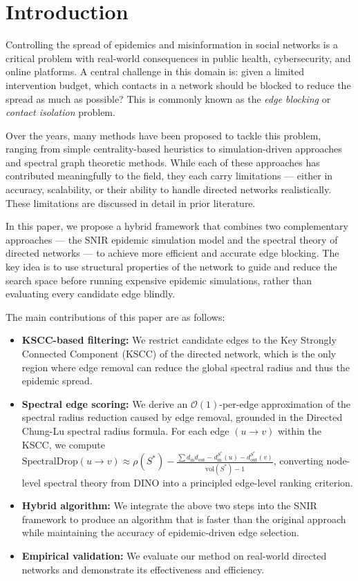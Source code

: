 \documentclass[conference]{IEEEtran}
\begin{document}
\section{Introduction}
Controlling the spread of epidemics and misinformation in social networks is a critical problem with real-world consequences in public health, cybersecurity, and online platforms. A central challenge in this domain is: given a limited intervention budget, which contacts in a network should be blocked to reduce the spread as much as possible? This is commonly known as the \textit{edge blocking} or \textit{contact isolation} problem.

Over the years, many methods have been proposed to tackle this problem, ranging from simple centrality-based heuristics to simulation-driven approaches and spectral graph theoretic methods. While each of these approaches has contributed meaningfully to the field, they each carry limitations --- either in accuracy, scalability, or their ability to handle directed networks realistically. These limitations are discussed in detail in prior literature.

In this paper, we propose a hybrid framework that combines two complementary approaches --- the SNIR epidemic simulation model and the spectral theory of directed networks --- to achieve more efficient and accurate edge blocking. The key idea is to use structural properties of the network to guide and reduce the search space before running expensive epidemic simulations, rather than evaluating every candidate edge blindly.

The main contributions of this paper are as follows:

\begin{itemize}
    \item \textbf{KSCC-based filtering:} We restrict candidate edges to the Key Strongly Connected Component (KSCC) of the directed network, which is the only region where edge removal can reduce the global spectral radius and thus the epidemic spread.
    
    \item \textbf{Spectral edge scoring:} We derive an $\mathcal{O}(1)$-per-edge approximation of the spectral radius reduction caused by edge removal, grounded in the Directed Chung-Lu spectral radius formula. For each edge $(u \to v)$ within the KSCC, we compute $\mathrm{SpectralDrop}(u{\to}v) \approx \rho(S^*) - \frac{\sum d_{\mathrm{in}} d_{\mathrm{out}} - d_{\mathrm{in}}^{S^*}(u) - d_{\mathrm{out}}^{S^*}(v)}{\mathrm{vol}(S^*)-1}$, converting node-level spectral theory from DINO into a principled edge-level ranking criterion.
    
    \item \textbf{Hybrid algorithm:} We integrate the above two steps into the SNIR framework to produce an algorithm that is faster than the original approach while maintaining the accuracy of epidemic-driven edge selection.
    
    \item \textbf{Empirical validation:} We evaluate our method on real-world directed networks and demonstrate its effectiveness and efficiency.
\end{itemize}
\end{document}
